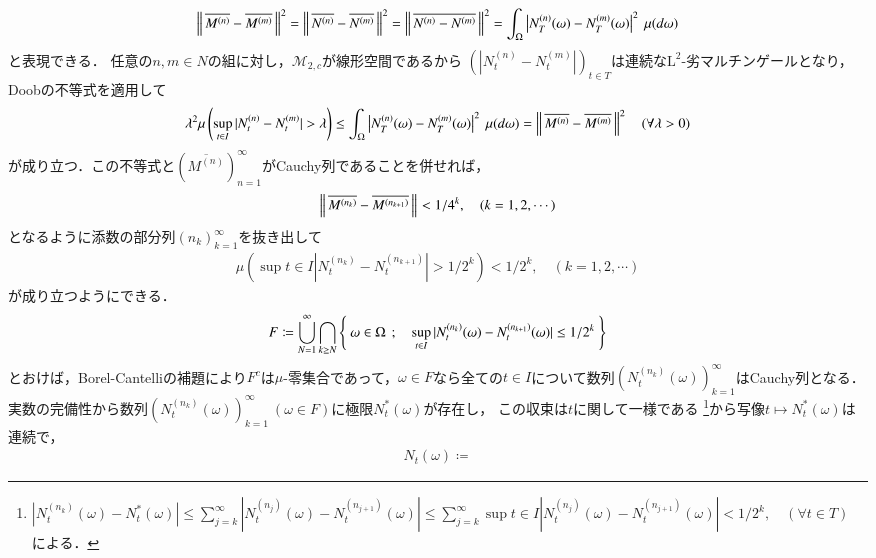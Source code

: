 \begin{prf}
		\begin{align}
			\left\|\, \overline{M^{(n)}} - \overline{M^{(m)}}\, \right\|_{}^2 = \left\|\, \overline{N^{(n)}} - \overline{N^{(m)}}\, \right\|_{}^2 
			=  \left\|\, \overline{N^{(n)} - N^{(m)}}\, \right\|_{}^2
			= \int_{\Omega} \left| N^{(n)}_T(\omega) - N^{(m)}_T(\omega) \right|^2\ \mu(d\omega)
		\end{align}
		と表現できる．
		任意の$n,m \in N$の組に対し，$\mathcal{M}_{2,c}$が線形空間であるから
		$\left(\left|N^{(n)}_t - N^{(m)}_t\right|\right)_{t \in T}$は連続な$\mathrm{L}^2$-劣マルチンゲールとなり，
		Doobの不等式を適用して
		\begin{align}
			\lambda^2 \mu\left(\operatorname*{sup}_{t \in I} |N^{(n)}_t - N^{(m)}_t| > \lambda\right) \leq \int_{\Omega} \left| N^{(n)}_T(\omega) - N^{(m)}_T(\omega) \right|^2\ \mu(d\omega)
			= \left\|\, \overline{M^{(n)}} - \overline{M^{(m)}}\, \right\|_{}^2 \quad (\forall \lambda > 0)
		\end{align}
		が成り立つ．この不等式と$\left(\overline{M^{(n)}}\right)_{n=1}^{\infty}$がCauchy列であることを併せれば，
		\begin{align}
			\left\|\, \overline{M^{(n_k)}} - \overline{M^{(n_{k+1})}}\, \right\|_{} < 1/4^k, \quad (k = 1,2,\cdots) \label{eq:mart_hilbert_1}
		\end{align}
		となるように添数の部分列$(n_k)_{k=1}^{\infty}$を抜き出して
		\begin{align}
			\mu\left(\sup{t \in I}{|N^{(n_k)}_t - N^{(n_{k+1})}_t| > 1/2^k}\right) < 1/2^k, \quad (k=1,2,\cdots)
		\end{align}
		が成り立つようにできる．
		\begin{align}
			F \coloneqq \bigcup_{N=1}^{\infty} \bigcap_{k \geq N} \left\{\ \omega \in \Omega\ \, ; \quad \operatorname*{sup}_{t \in I} |N^{(n_k)}_t(\omega) - N^{(n_{k+1})}_t(\omega)| \leq 1/2^k\ \right\}
		\end{align}
		とおけば，Borel-Cantelliの補題により$F^c$は$\mu$-零集合であって，$\omega \in F$なら全ての$t \in I$について数列$\left(N^{(n_k)}_t(\omega)\right)_{k=1}^{\infty}$はCauchy列となる．
		実数の完備性から数列$\left(N^{(n_k)}_t(\omega)\right)_{k=1}^{\infty}\ (\omega \in F)$に極限$N^*_t(\omega)$が存在し，
		この収束は$t$に関して一様である
		\footnote{
			$\left| N^{(n_k)}_t(\omega) - N^*_t(\omega) \right| \leq \sum_{j=k}^{\infty} \left| N^{(n_j)}_t(\omega) - N^{(n_{j+1})}_t(\omega) \right|
			\leq \sum_{j=k}^{\infty} \sup{t \in I}{\left| N^{(n_j)}_t(\omega) - N^{(n_{j+1})}_t(\omega) \right|} < 1/2^k, \quad (\forall t \in T)$
			による．
		}から写像$t \longmapsto N^*_t(\omega)$は連続で，
		\begin{align}
			N_t(\omega) \coloneqq 

\end{align}
\end{prf}
